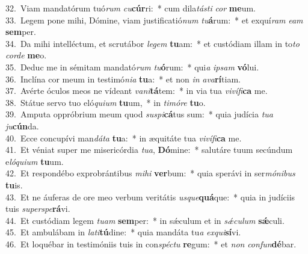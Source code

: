 {32.~}Viam mandatórum tuó\textit{rum} \textit{cu}\textbf{cúr}ri:~* cum dila\textit{tá}\textit{sti} \textit{cor} \textbf{me}um.\\
{33.~}Legem pone mihi, Dómine, viam justificatió\textit{num} \textit{tu}\textbf{á}rum:~* et exquí\textit{ram} \textit{e}\textit{am} \textbf{sem}per.\\
{34.~}Da mihi intelléctum, et scrutábor \textit{le}\textit{gem} \textbf{tu}am:~* et custódiam illam in to\textit{to} \textit{cor}\textit{de} \textbf{me}o.\\
{35.~}Deduc me in sémitam mandató\textit{rum} \textit{tu}\textbf{ó}rum:~* qui\textit{a} \textit{i}\textit{psam} \textbf{vó}lui.\\
{36.~}Inclína cor meum in testimó\textit{ni}\textit{a} \textbf{tu}a:~* et non \textit{in} \textit{a}\textit{va}\textbf{rí}tiam.\\
{37.~}Avérte óculos meos ne vídeant \textit{va}\textit{ni}\textbf{tá}tem:~* in via tua \textit{vi}\textit{ví}\textit{fi}\textbf{ca} me.\\
{38.~}Státue servo tuo eló\textit{qui}\textit{um} \textbf{tu}um,~* in \textit{ti}\textit{mó}\textit{re} \textbf{tu}o.\\
{39.~}Amputa oppróbrium meum quod \textit{su}\textit{spi}\textbf{cá}tus sum:~* quia judícia \textit{tu}\textit{a} \textit{ju}\textbf{cún}da.\\
{40.~}Ecce concupívi man\textit{dá}\textit{ta} \textbf{tu}a:~* in æquitáte tua \textit{vi}\textit{ví}\textit{fi}\textbf{ca} me.\\
{41.~}Et véniat super me misericórdia \textit{tu}\textit{a}, \textbf{Dó}mine:~* salutáre tuum secúndum e\textit{ló}\textit{qui}\textit{um} \textbf{tu}um.\\
{42.~}Et respondébo exprobrántibus \textit{mi}\textit{hi} \textbf{ver}bum:~* quia sperávi in ser\textit{mó}\textit{ni}\textit{bus} \textbf{tu}is.\\
{43.~}Et ne áuferas de ore meo verbum veritátis \textit{us}\textit{que}\textbf{quá}que:~* quia in judíciis tuis \textit{su}\textit{per}\textit{spe}\textbf{rá}vi.\\
{44.~}Et custódiam legem \textit{tu}\textit{am} \textbf{sem}per:~* in sǽculum et in \textit{sǽ}\textit{cu}\textit{lum} \textbf{sǽ}culi.\\
{45.~}Et ambulábam in \textit{la}\textit{ti}\textbf{tú}dine:~* quia mandáta tu\textit{a} \textit{ex}\textit{qui}\textbf{sí}vi.\\
{46.~}Et loquébar in testimóniis tuis in con\textit{spé}\textit{ctu} \textbf{re}gum:~* et \textit{non} \textit{con}\textit{fun}\textbf{dé}bar.\\
